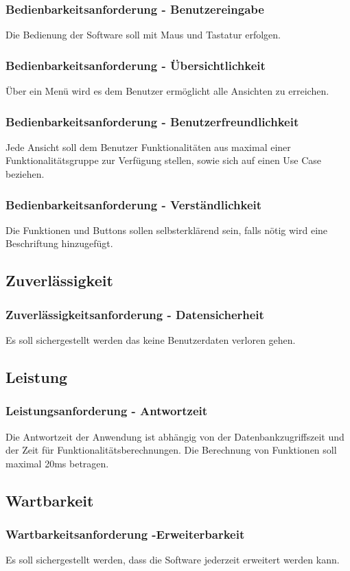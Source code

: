 \documentclass[12pt,a4paper,onecolumn]{article}
\begin{document}
\subsubsection{Bedienbarkeitsanforderung - Benutzereingabe}
Die Bedienung der Software soll mit Maus und Tastatur erfolgen.
\subsubsection{Bedienbarkeitsanforderung - Übersichtlichkeit}
Über ein Menü wird es dem Benutzer ermöglicht alle Ansichten zu erreichen.
\subsubsection{Bedienbarkeitsanforderung - Benutzerfreundlichkeit}
Jede Ansicht soll dem Benutzer Funktionalitäten aus maximal einer Funktionalitätsgruppe zur Verfügung stellen, sowie sich auf einen Use Case beziehen.
\subsubsection{Bedienbarkeitsanforderung - Verständlichkeit}
Die Funktionen und Buttons sollen selbsterklärend sein, falls nötig wird eine Beschriftung hinzugefügt.

\subsection{Zuverlässigkeit}
\subsubsection{Zuverlässigkeitsanforderung - Datensicherheit}
Es soll sichergestellt werden das keine Benutzerdaten verloren gehen.
\subsection{Leistung}
\subsubsection{Leistungsanforderung - Antwortzeit}
Die Antwortzeit der Anwendung ist abhängig von der Datenbankzugriffszeit und der Zeit für Funktionalitätsberechnungen.
Die Berechnung von Funktionen soll maximal 20ms betragen.
\subsection{Wartbarkeit}
\subsubsection{Wartbarkeitsanforderung -Erweiterbarkeit}
Es soll sichergestellt werden, dass die Software jederzeit erweitert werden kann.
\end{document}

